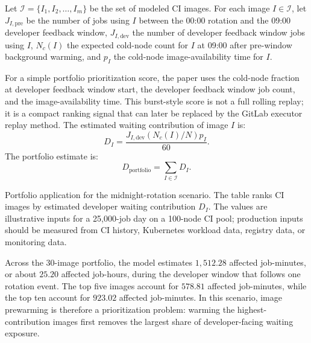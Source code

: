 \documentclass[11pt,a4paper]{article}
\begin{document}
Let \(\mathcal{I}=\{I_1,I_2,\dots,I_m\}\) be the set of modeled CI images. For each image \(I\in\mathcal{I}\), let \(J_{I,\mathrm{pre}}\) be the number of jobs using \(I\) between the 00:00 rotation and the 09:00 developer feedback window, \(J_{I,\mathrm{dev}}\) the number of developer feedback window jobs using \(I\), \(N_c(I)\) the expected cold-node count for \(I\) at 09:00 after pre-window background warming, and \(p_I\) the cold-node image-availability time for \(I\).

For a simple portfolio prioritization score, the paper uses the cold-node fraction at developer feedback window start, the developer feedback window job count, and the image-availability time. This burst-style score is not a full rolling replay; it is a compact ranking signal that can later be replaced by the GitLab executor replay method. The estimated waiting contribution of image \(I\) is:
\begin{equation}
  D_I
  =
  \frac{J_{I,\mathrm{dev}}(N_c(I)/N)p_I}{60}.
\end{equation}
The portfolio estimate is:
\begin{equation}
  D_{\mathrm{portfolio}}
  =
  \sum_{I\in\mathcal{I}} D_I.
\end{equation}

\begin{table}[H]
\centering
\caption{Portfolio application for the midnight-rotation scenario. The table ranks CI images by estimated developer waiting contribution \(D_I\). The values are illustrative inputs for a 25,000-job day on a 100-node CI pool; production inputs should be measured from CI history, Kubernetes workload data, registry data, or monitoring data.}
\label{tab:multiimage}
\scriptsize
\begin{adjustbox}{max width=\linewidth}

\end{adjustbox}
\end{table}

Across the 30-image portfolio, the model estimates \(1{,}512.28\) affected job-minutes, or about \(25.20\) affected job-hours, during the developer window that follows one rotation event. The top five images account for \(578.81\) affected job-minutes, while the top ten account for \(923.02\) affected job-minutes. In this scenario, image prewarming is therefore a prioritization problem: warming the highest-contribution images first removes the largest share of developer-facing waiting exposure.
\end{document}
